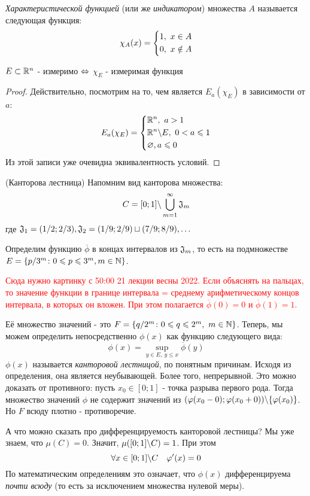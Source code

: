 \begin{definition}
	\textit{Характеристической функцией} (или же \textit{индикатором}) множества $A$ называется следующая функция:
	\[
		\chi_A(x) = \left\{\begin{aligned}
			&{1,\ x \in A}
			\\
			&{0,\ x \notin A}
		\end{aligned}\right.
	\]
\end{definition}

\begin{proposition}
	$E \subset \mathbb{R}^n$ - измеримо $\Leftrightarrow$ $\chi_E$ - измеримая функция
\end{proposition}

\begin{proof}
	Действительно, посмотрим на то, чем является $E_a(\chi_E)$ в зависимости от $a$:
	\[
		E_a(\chi_E) = \left\{\begin{aligned}
			&{\mathbb{R}^n,\ a > 1}
			\\
			&{\mathbb{R}^n \backslash E,\ 0 < a \leqslant 1}
			\\
			&{\varnothing, a \leqslant 0}
		\end{aligned}\right.
	\]
	Из этой записи уже очевидна эквивалентность условий.
\end{proof}

\begin{example} (Канторова лестница)
	Напомним вид канторова множества:
	\[
		C = [0; 1] \backslash \bigcup_{m = 1}^\infty \mathfrak{J}_m
	\]
	где $\mathfrak{J}_1 = (1/2; 2/3), \mathfrak{J}_2 = (1/9; 2/9) \sqcup (7/9; 8/9), \ldots$
	
	Определим функцию $\overline{\phi}$ в концах интервалов из $\mathfrak{J}_m$, то есть на подмножестве $E = \{p/3^m \colon 0 \leqslant p \leqslant 3^m, m \in \mathbb{N}\}$.
	
	\textcolor{red}{Сюда нужно картинку с 50:00 21 лекции весны 2022. Если объяснять на пальцах, то значение функции в границе интервала = среднему арифметическому концов интервала, в которых он вложен. При этом полагается $\overline{\phi}(0) = 0$ и $\overline{\phi}(1) = 1$.}
	
	Её множество значений - это $F = \{q / 2^m \colon 0 \leqslant q \leqslant 2^m,\ m \in \mathbb{N}\}$. Теперь, мы можем определить непосредственно $\phi(x)$ как функцию следующего вида:
	\[
		\phi(x) = \sup_{y \in E,\ y \le x} \overline{\phi}(y)
	\]
	$\phi(x)$ называется \textit{канторовой лестницой}, по понятным причинам. Исходя из определения, она является неубывающей. Более того, непрерывной. Это можно доказать от противного: пусть $x_0 \in [0; 1]$ - точка разрыва первого рода. Тогда множество значений $\phi$ не содержит значений из $(\varphi(x_0 - 0); \varphi(x_0 + 0)) \backslash \{\varphi(x_0)\}$. Но $F$ всюду плотно - противоречие.
	
	А что можно сказать про дифференцируемость канторовой лестницы? Мы уже знаем, что $\mu(C) = 0$. Значит, $\mu([0; 1] \backslash C) = 1$. При этом
	\[
		\forall x \in [0; 1] \backslash C \quad \varphi'(x) = 0
	\]
	По математическим определениям это означает, что $\phi(x)$ дифференцируема \textit{почти всюду} (то есть за исключением множества нулевой меры).
\end{example}


